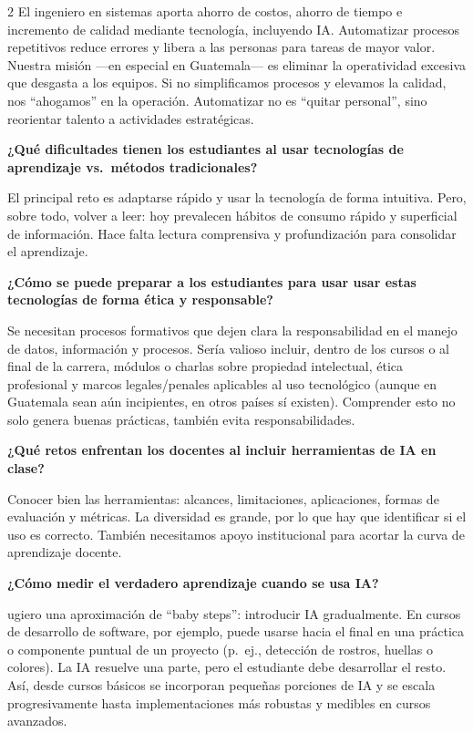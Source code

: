\documentclass[12pt,spanish,Letterpaper,openany]{book}
\begin{document}
\begin {multicols}{2}
El ingeniero en sistemas aporta ahorro de costos, ahorro de tiempo e incremento de calidad mediante tecnología, incluyendo IA. Automatizar procesos repetitivos reduce errores y libera a las personas para tareas de mayor valor. Nuestra misión ---en especial en Guatemala--- es eliminar la operatividad excesiva que desgasta a los equipos. Si no simplificamos procesos y elevamos la calidad, nos ``ahogamos'' en la operación. Automatizar no es ``quitar personal'', sino reorientar talento a actividades estratégicas.

\textbf{¿Qué dificultades tienen los estudiantes al usar tecnologías de aprendizaje vs.~métodos tradicionales?}

El principal reto es adaptarse rápido y usar la tecnología de forma intuitiva. Pero, sobre todo, volver a leer: hoy prevalecen hábitos de consumo rápido y superficial de información. Hace falta lectura comprensiva y profundización para consolidar el aprendizaje.

\textbf{¿Cómo se puede preparar a los estudiantes para usar usar estas tecnologías de forma ética y responsable?}

Se necesitan procesos formativos que dejen clara la responsabilidad en el manejo de datos, información y procesos. Sería valioso incluir, dentro de los cursos o al final de la carrera, módulos o charlas sobre propiedad intelectual, ética profesional y marcos legales/penales aplicables al uso tecnológico (aunque en Guatemala sean aún incipientes, en otros países sí existen). Comprender esto no solo genera buenas prácticas, también evita responsabilidades.

\textbf{¿Qué retos enfrentan los docentes al incluir herramientas de IA en clase?}

Conocer bien las herramientas: alcances, limitaciones, aplicaciones, formas de evaluación y métricas. La diversidad es grande, por lo que hay que identificar si el uso es correcto. También necesitamos apoyo institucional para acortar la curva de aprendizaje docente.

\textbf{¿Cómo medir el verdadero aprendizaje cuando se usa IA?}

ugiero una aproximación de ``baby steps'': introducir IA gradualmente. En cursos de desarrollo de software, por ejemplo, puede usarse hacia el final en una práctica o componente puntual de un proyecto (p.~ej., detección de rostros, huellas o colores). La IA resuelve una parte, pero el estudiante debe desarrollar el resto. Así, desde cursos básicos se incorporan pequeñas porciones de IA y se escala progresivamente hasta implementaciones más robustas y medibles en cursos avanzados.


\end{multicols}
\end{document}
